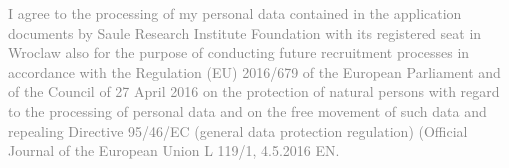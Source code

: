 \vspace*{2mm}
\begin{minipage}{.5\textwidth}\tiny
  \textcolor{gray}{I agree to the processing of my personal data contained in the application documents by Saule Research Institute Foundation with its registered seat in Wroclaw also for the purpose of conducting future recruitment processes in accordance with the Regulation (EU) 2016/679 of the European Parliament and of the Council of 27 April 2016 on the protection of natural persons with regard to the processing of personal data and on the free movement of such data and repealing Directive 95/46/EC (general data protection regulation) (Official Journal of the European Union L 119/1, 4.5.2016 EN.}
\end{minipage}
\vspace*{-5mm}